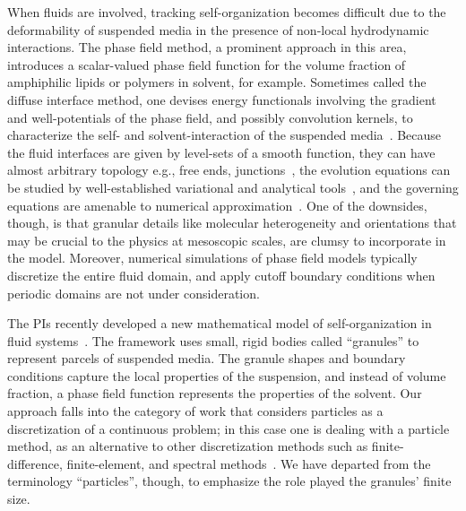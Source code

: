 When fluids are involved, tracking self-organization becomes difficult
due to the deformability of suspended media in the presence of non-local
hydrodynamic interactions. The phase field method, a prominent approach
in this area, introduces a scalar-valued phase field function for the
volume fraction of amphiphilic lipids or polymers in solvent, for
example. Sometimes called the diffuse interface method, one devises
energy functionals involving the gradient and well-potentials of the
phase field, and possibly convolution kernels, to characterize the self-
and solvent-interaction of the suspended
media~\cite{Promislow2022UndulatedBI, C9SM01983A,doi:10.1063/5.0009734,
LiAn-Chang16, Choksi2003OnTD}. Because the fluid interfaces are given by
level-sets of a smooth function, they can have almost arbitrary topology
e.g., free ends, junctions~\cite{Promislow2017ExistenceBA,
Promislow2022UndulatedBI}, the evolution equations can be studied by
well-established variational and analytical
tools~\cite{Gavish2011CurvatureDF, Dai2019WeakSF, Dai2015CompetitiveGE,
Dai2022GeometricEO, Dai2020MinimizersFT, Dai2013GeometricEO}, and the
governing equations are amenable to numerical
approximation~\cite{Christlieb2020BenchmarkCO,
Christlieb2019CompetitionAC}. One of the downsides, though, is that
granular details like molecular heterogeneity and orientations that may
be crucial to the physics at mesoscopic scales, are clumsy to
incorporate in the model. Moreover, numerical simulations of phase field
models typically discretize the entire fluid domain, and apply cutoff
boundary conditions when periodic domains are not under consideration. 

The PIs recently developed a new mathematical model of self-organization
in fluid systems~\cite{FuQuRyYo22, fu-ryh-qua-you2022, Fu2018_SIAM}. The
framework uses small, rigid bodies called ``granules'' to represent
parcels of suspended media. The granule shapes and boundary conditions
capture the local properties of the suspension, and instead of volume
fraction, a phase field function represents the properties of the
solvent. Our approach falls into the category of work that considers
particles as a discretization of a continuous problem; in this case one
is dealing with a particle method, as an alternative to other
discretization methods such as finite-difference, finite-element, and
spectral methods~\cite{Wilson2021ComparisonOT}. We have departed from
the terminology ``particles'', though, to emphasize the role played the
granules' finite size.


